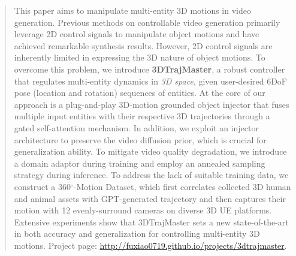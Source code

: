 \begin{abstract}

This paper aims to manipulate multi-entity 3D motions in video generation. Previous methods on controllable video generation primarily leverage 2D control signals to manipulate object motions and have achieved remarkable synthesis results. However, 2D control signals are inherently limited in expressing the 3D nature of object motions. To overcome this problem, we introduce \textbf{3DTrajMaster}, a robust controller that regulates multi-entity dynamics in \textit{3D space}, given user-desired 6DoF pose (location and rotation) sequences of entities. At the core of our approach is a plug-and-play 3D-motion grounded object injector that fuses multiple input entities with their respective 3D trajectories through a gated self-attention mechanism. In addition, we exploit an injector architecture to preserve the video diffusion prior, which is crucial for generalization ability.
To mitigate video quality degradation, we introduce a domain adaptor during training and employ an annealed sampling strategy during inference. To address the lack of suitable training data, we construct a 360$^{\circ}$-Motion Dataset, which first correlates collected 3D human and animal assets with GPT-generated trajectory and then captures their motion with 12 evenly-surround cameras on diverse 3D UE platforms. Extensive experiments show that 3DTrajMaster sets a new state-of-the-art in both accuracy and generalization for controlling multi-entity 3D motions. Project page: \url{http://fuxiao0719.github.io/projects/3dtrajmaster}.


\end{abstract}
